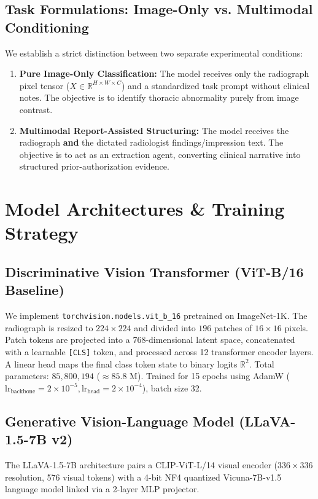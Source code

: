 \documentclass[conference]{IEEEtran}
\begin{document}
\subsection{Task Formulations: Image-Only vs. Multimodal Conditioning}
We establish a strict distinction between two separate experimental conditions:
\begin{enumerate}
    \item \textbf{Pure Image-Only Classification:} The model receives only the radiograph pixel tensor ($X \in \mathbb{R}^{H \times W \times C}$) and a standardized task prompt without clinical notes. The objective is to identify thoracic abnormality purely from image contrast.
    \item \textbf{Multimodal Report-Assisted Structuring:} The model receives the radiograph \textbf{and} the dictated radiologist findings/impression text. The objective is to act as an extraction agent, converting clinical narrative into structured prior-authorization evidence.
\end{enumerate}

\section{Model Architectures \& Training Strategy}
\subsection{Discriminative Vision Transformer (ViT-B/16 Baseline)}
We implement \texttt{torchvision.models.vit\_b\_16} pretrained on ImageNet-1K. The radiograph is resized to $224 \times 224$ and divided into $196$ patches of $16 \times 16$ pixels. Patch tokens are projected into a 768-dimensional latent space, concatenated with a learnable \texttt{[CLS]} token, and processed across 12 transformer encoder layers. A linear head maps the final class token state to binary logits $\mathbb{R}^2$. 
Total parameters: $85,800,194$ ($\approx 85.8\text{ M}$). Trained for 15 epochs using AdamW ($\text{lr}_{\text{backbone}} = 2\times 10^{-5}, \text{lr}_{\text{head}} = 2\times 10^{-4}$), batch size 32.

\subsection{Generative Vision-Language Model (LLaVA-1.5-7B v2)}
The LLaVA-1.5-7B architecture pairs a CLIP-ViT-L/14 visual encoder ($336 \times 336$ resolution, 576 visual tokens) with a 4-bit NF4 quantized Vicuna-7B-v1.5 language model linked via a 2-layer MLP projector.
\end{document}
